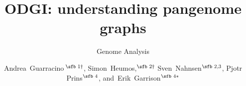 \documentclass{bioinfo}
\begin{document}

\subtitle{Genome Analysis}

\title[ODGI: understanding pangenome graphs]{ODGI: understanding pangenome graphs}
\author[Guarracino, Heumos \textit{et~al}.]{
Andrea~Guarracino\,$^{\text{\sfb 1} \dagger}$,
Simon~Heumos,$^{\text{\sfb 2} \dagger}$
Sven~Nahnsen$^{\text{\sfb 2,3}}$,
Pjotr \\Prins{}$^{\text{\sfb 4}}$,
and~Erik~Garrison$^{\text{\sfb 4}*}$
}

\address{
$^{\text{\sf 1}}$Genomics Research Centre, Human Technopole, Milan, Italy \\
$^{\text{\sf 2}}$Quantitative Biology Center (QBiC), University of T\"ubingen, T\"ubingen, Germany, 72076 \\
$^{\text{\sf 3}}$Biomedical Data Science, Dept. of Computer Science, University of T\"ubingen, T\"ubingen, Germany, 72076 \\
$^{\text{\sf 4}}$University of Tennessee Health Science Center, Memphis, TN, USA
}




\end{document}
